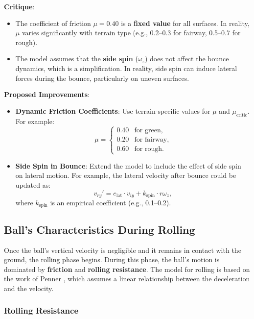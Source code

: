\documentclass[10pt,a4paper]{report}
\begin{document}
\textbf{Critique}:
\begin{itemize}
    \item The coefficient of friction $\mu = 0.40$ is a \textbf{fixed value} 
    for all surfaces. In reality, $\mu$ varies significantly with terrain type 
    (e.g., 0.2--0.3 for fairway, 0.5--0.7 for rough).
    \item The model assumes that the \textbf{side spin} ($\omega_z$) does not 
    affect the bounce dynamics, which is a simplification. In reality, side spin 
    can induce lateral forces during the bounce, particularly on uneven surfaces.
\end{itemize}

\textbf{Proposed Improvements}:
\begin{itemize}
    \item \textbf{Dynamic Friction Coefficients}: Use terrain-specific values 
    for $\mu$ and $\mu_{\text{critic}}$. For example:
    \[
    \mu =
    \begin{cases}
    0.40 & \text{for green}, \\
    0.20 & \text{for fairway}, \\
    0.60 & \text{for rough}.
    \end{cases}
    \]
    \item \textbf{Side Spin in Bounce}: Extend the model to include the effect 
    of side spin on lateral motion. For example, the lateral velocity after 
    bounce could be updated as:
    \[
    v_{ry}' = e_{\text{lat}} \cdot v_{iy} + k_{\text{spin}} \cdot r \omega_z,
    \]
    where $k_{\text{spin}}$ is an empirical coefficient (e.g., 0.1--0.2).
\end{itemize}

\subsection{Ball's Characteristics During Rolling}
\label{subsec:rolling_characteristics}

Once the ball's vertical velocity is negligible and it remains in contact with 
the ground, the rolling phase begins. During this phase, the ball's motion is 
dominated by \textbf{friction} and \textbf{rolling resistance}. The model 
for rolling is based on the work of Penner \cite{PA022,PA07}, which assumes 
a linear relationship between the deceleration and the velocity.

\subsubsection{Rolling Resistance}
\label{subsubsec:rolling_resistance}
\end{document}
